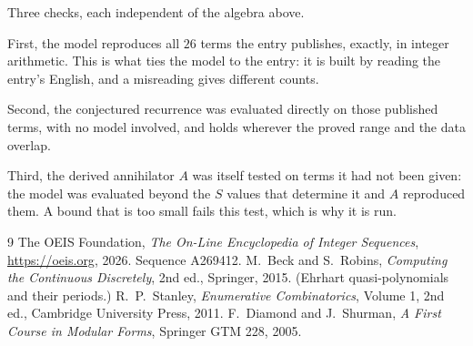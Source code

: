 \documentclass[11pt,a4paper]{article}
\theoremstyle{plain}
\theoremstyle{definition}
\begin{document}
Three checks, each independent of the algebra above.

First, the model reproduces all $26$ terms the entry publishes, exactly, in integer
arithmetic. This is what ties the model to the entry: it is built by reading the entry's
English, and a misreading gives different counts.

Second, the conjectured recurrence was evaluated directly on those published terms, with no
model involved, and holds wherever the proved range and the data overlap.

Third, the derived annihilator $A$ was itself tested on terms it had not been given: the model
was evaluated beyond the $S$ values that determine it and $A$ reproduced them. A bound that is
too small fails this test, which is why it is run.

\begin{thebibliography}{9}
 The OEIS Foundation, \emph{The On-Line Encyclopedia of Integer
Sequences}, \url{https://oeis.org}, 2026. Sequence A269412.
 M.~Beck and S.~Robins, \emph{Computing the Continuous Discretely},
2nd ed., Springer, 2015. (Ehrhart quasi-polynomials and their periods.)
 R.~P.~Stanley, \emph{Enumerative Combinatorics}, Volume 1, 2nd ed.,
Cambridge University Press, 2011.
 F.~Diamond and J.~Shurman, \emph{A First Course in Modular Forms},
Springer GTM 228, 2005.
\end{thebibliography}
\end{document}

